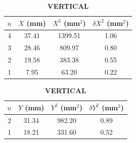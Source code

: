 \documentclass[a4paper,11pt]{article}
\begin{document}
\begin{table}[H]
  \centering
  \caption{1 kg — HORIZONTAL (left) and VERTICAL (right)}\label{tab:1kg-hv}
  \begin{subtable}[t]{0.47\linewidth}
    \centering
    \caption*{\textbf{HORIZONTAL}}\label{tab:1kg-h}
    \begin{tabular}{cccc}
      \toprule
      $n$ & $X$ (mm) & $X^2$ (mm$^2$) & $\delta X^2$ (mm$^2$)\\
      \midrule
       4 & 37.41 & 1399.51 & 1.06\\
       3 & 28.46 &  809.97 & 0.80\\
       2 & 19.58 &  383.38 & 0.55\\
       1 &  7.95 &   63.20 & 0.22\\
      \bottomrule
    \end{tabular}
  \end{subtable}
  \hfill
  \begin{subtable}[t]{0.47\linewidth}
    \centering
    \caption*{\textbf{VERTICAL}}\label{tab:1kg-v}
    \begin{tabular}{cccc}
      \toprule
      $n$ & $Y$ (mm) & $Y^2$ (mm$^2$) & $\delta Y^2$ (mm$^2$)\\
      \midrule
       2 & 31.34 &  982.20 & 0.89\\
       1 & 18.21 &  331.60 & 0.52\\
      \bottomrule
    \end{tabular}
  \end{subtable}
\end{table}
\end{document}
